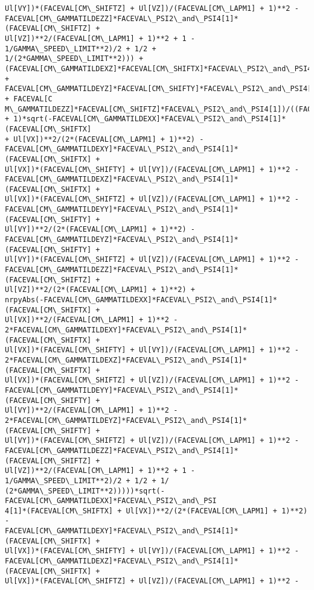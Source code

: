 \documentclass[landscape,letterpaper,10pt,english]{article}
\begin{document}
\begin{Verbatim}[commandchars=\\\{\}]
Ul[VY])*(FACEVAL[CM\_SHIFTZ] + Ul[VZ])/(FACEVAL[CM\_LAPM1] + 1)**2 -
FACEVAL[CM\_GAMMATILDEZZ]*FACEVAL\_PSI2\_and\_PSI4[1]*(FACEVAL[CM\_SHIFTZ] +
Ul[VZ])**2/(FACEVAL[CM\_LAPM1] + 1)**2 + 1 - 1/GAMMA\_SPEED\_LIMIT**2)/2 + 1/2 +
1/(2*GAMMA\_SPEED\_LIMIT**2))) +
(FACEVAL[CM\_GAMMATILDEXZ]*FACEVAL[CM\_SHIFTX]*FACEVAL\_PSI2\_and\_PSI4[1] +
FACEVAL[CM\_GAMMATILDEYZ]*FACEVAL[CM\_SHIFTY]*FACEVAL\_PSI2\_and\_PSI4[1] + FACEVAL[C
M\_GAMMATILDEZZ]*FACEVAL[CM\_SHIFTZ]*FACEVAL\_PSI2\_and\_PSI4[1])/((FACEVAL[CM\_LAPM1]
+ 1)*sqrt(-FACEVAL[CM\_GAMMATILDEXX]*FACEVAL\_PSI2\_and\_PSI4[1]*(FACEVAL[CM\_SHIFTX]
+ Ul[VX])**2/(2*(FACEVAL[CM\_LAPM1] + 1)**2) -
FACEVAL[CM\_GAMMATILDEXY]*FACEVAL\_PSI2\_and\_PSI4[1]*(FACEVAL[CM\_SHIFTX] +
Ul[VX])*(FACEVAL[CM\_SHIFTY] + Ul[VY])/(FACEVAL[CM\_LAPM1] + 1)**2 -
FACEVAL[CM\_GAMMATILDEXZ]*FACEVAL\_PSI2\_and\_PSI4[1]*(FACEVAL[CM\_SHIFTX] +
Ul[VX])*(FACEVAL[CM\_SHIFTZ] + Ul[VZ])/(FACEVAL[CM\_LAPM1] + 1)**2 -
FACEVAL[CM\_GAMMATILDEYY]*FACEVAL\_PSI2\_and\_PSI4[1]*(FACEVAL[CM\_SHIFTY] +
Ul[VY])**2/(2*(FACEVAL[CM\_LAPM1] + 1)**2) -
FACEVAL[CM\_GAMMATILDEYZ]*FACEVAL\_PSI2\_and\_PSI4[1]*(FACEVAL[CM\_SHIFTY] +
Ul[VY])*(FACEVAL[CM\_SHIFTZ] + Ul[VZ])/(FACEVAL[CM\_LAPM1] + 1)**2 -
FACEVAL[CM\_GAMMATILDEZZ]*FACEVAL\_PSI2\_and\_PSI4[1]*(FACEVAL[CM\_SHIFTZ] +
Ul[VZ])**2/(2*(FACEVAL[CM\_LAPM1] + 1)**2) +
nrpyAbs(-FACEVAL[CM\_GAMMATILDEXX]*FACEVAL\_PSI2\_and\_PSI4[1]*(FACEVAL[CM\_SHIFTX] +
Ul[VX])**2/(FACEVAL[CM\_LAPM1] + 1)**2 -
2*FACEVAL[CM\_GAMMATILDEXY]*FACEVAL\_PSI2\_and\_PSI4[1]*(FACEVAL[CM\_SHIFTX] +
Ul[VX])*(FACEVAL[CM\_SHIFTY] + Ul[VY])/(FACEVAL[CM\_LAPM1] + 1)**2 -
2*FACEVAL[CM\_GAMMATILDEXZ]*FACEVAL\_PSI2\_and\_PSI4[1]*(FACEVAL[CM\_SHIFTX] +
Ul[VX])*(FACEVAL[CM\_SHIFTZ] + Ul[VZ])/(FACEVAL[CM\_LAPM1] + 1)**2 -
FACEVAL[CM\_GAMMATILDEYY]*FACEVAL\_PSI2\_and\_PSI4[1]*(FACEVAL[CM\_SHIFTY] +
Ul[VY])**2/(FACEVAL[CM\_LAPM1] + 1)**2 -
2*FACEVAL[CM\_GAMMATILDEYZ]*FACEVAL\_PSI2\_and\_PSI4[1]*(FACEVAL[CM\_SHIFTY] +
Ul[VY])*(FACEVAL[CM\_SHIFTZ] + Ul[VZ])/(FACEVAL[CM\_LAPM1] + 1)**2 -
FACEVAL[CM\_GAMMATILDEZZ]*FACEVAL\_PSI2\_and\_PSI4[1]*(FACEVAL[CM\_SHIFTZ] +
Ul[VZ])**2/(FACEVAL[CM\_LAPM1] + 1)**2 + 1 - 1/GAMMA\_SPEED\_LIMIT**2)/2 + 1/2 + 1/
(2*GAMMA\_SPEED\_LIMIT**2)))))*sqrt(-FACEVAL[CM\_GAMMATILDEXX]*FACEVAL\_PSI2\_and\_PSI
4[1]*(FACEVAL[CM\_SHIFTX] + Ul[VX])**2/(2*(FACEVAL[CM\_LAPM1] + 1)**2) -
FACEVAL[CM\_GAMMATILDEXY]*FACEVAL\_PSI2\_and\_PSI4[1]*(FACEVAL[CM\_SHIFTX] +
Ul[VX])*(FACEVAL[CM\_SHIFTY] + Ul[VY])/(FACEVAL[CM\_LAPM1] + 1)**2 -
FACEVAL[CM\_GAMMATILDEXZ]*FACEVAL\_PSI2\_and\_PSI4[1]*(FACEVAL[CM\_SHIFTX] +
Ul[VX])*(FACEVAL[CM\_SHIFTZ] + Ul[VZ])/(FACEVAL[CM\_LAPM1] + 1)**2 -

\end{Verbatim}
\end{document}
